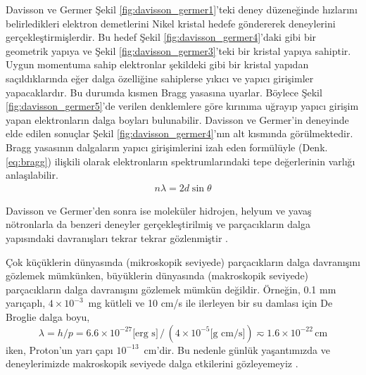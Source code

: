 \documentclass[00_kitap.tex]{subfiles}
\begin{document}
Davisson ve Germer Şekil \ref{fig:davisson_germer1}'teki deney düzeneğinde hızlarını belirledikleri elektron demetlerini Nikel kristal hedefe göndererek deneylerini gerçekleştirmişlerdir. Bu hedef Şekil \ref{fig:davisson_germer4}'daki gibi bir geometrik yapıya ve Şekil \ref{fig:davisson_germer3}'teki bir kristal yapıya sahiptir. Uygun momentuma sahip elektronlar şekildeki gibi bir kristal yapıdan saçıldıklarında eğer dalga özelliğine sahiplerse yıkıcı ve yapıcı girişimler yapacaklardır. Bu durumda kısmen Bragg yasasına uyarlar. Böylece Şekil \ref{fig:davisson_germer5}'de verilen denklemlere göre kırınıma uğrayıp yapıcı girişim yapan elektronların dalga boyları bulunabilir. Davisson ve Germer'in deneyinde elde edilen sonuçlar Şekil \ref{fig:davisson_germer4}'nın alt kısmında görülmektedir. Bragg yasasının dalgaların yapıcı girişimlerini izah eden formülüyle (Denk. \ref{eq:bragg}) ilişkili olarak elektronların spektrumlarındaki tepe değerlerinin varlığı anlaşılabilir.
\begin{align}
\label{eq:bragg}
n\lambda = 2 d \sin\theta
\end{align}

Davisson ve Germer'den sonra ise moleküler hidrojen, helyum ve yavaş nötronlarla da benzeri deneyler gerçekleştirilmiş ve parçacıkların dalga yapısındaki davranışları tekrar tekrar gözlenmiştir \cite{book:Gasiorowicz}.

Çok küçüklerin dünyasında (mikroskopik seviyede) parçacıkların dalga davranışını gözlemek mümkünken, büyüklerin dünyasında (makroskopik seviyede) parçacıkların dalga davranışını gözlemek mümkün değildir. Örneğin, 0.1 mm yarıçaplı, $4\times 10^{-3}$~mg kütleli ve 10 cm/s ile ilerleyen bir su damlası için De Broglie dalga boyu,
\begin{equation*}
\lambda = h/p = 6.6\times 10^{-27} \text{[erg s]}\,/\,(4\times 10^{-5} \text{[g cm/s]}) \eqsim 1.6\times 10^{-22}\,\text{cm}
\end{equation*}
iken, Proton'un yarı çapı $10^{-13}$~cm'dir. Bu nedenle günlük yaşantımızda ve deneylerimizde makroskopik seviyede dalga etkilerini gözleyemeyiz \cite{book:Gasiorowicz}. 

\end{document}
